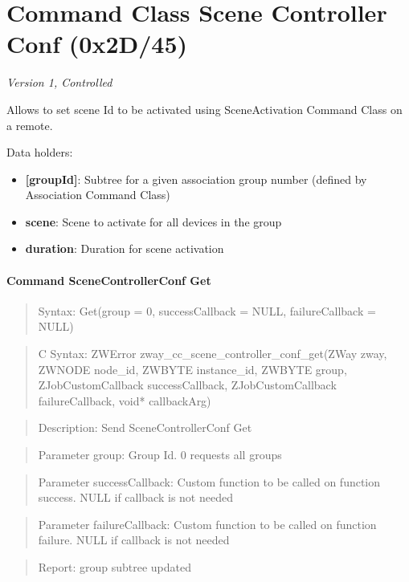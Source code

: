 \section{Command Class Scene Controller Conf (0x2D/45)}

\textit{Version 1, Controlled}
\newline

Allows to set scene Id to be activated using SceneActivation Command Class on a remote.
\newline

\noindent
Data holders:

\begin{itemize}
\item \textbf{[groupId]}: Subtree for a given association group number (defined by Association Command Class)
\item \qquad\textbf{scene}: Scene to activate for all devices in the group
\item \qquad\textbf{duration}: Duration for scene activation
\end{itemize}

\paragraph{Command SceneControllerConf Get}
\begin{quote}Syntax: Get(group = 0, successCallback = NULL, failureCallback = NULL)\end{quote}
\begin{quote}C Syntax: ZWError zway\_cc\_scene\_controller\_conf\_get(ZWay zway, ZWNODE node\_id, ZWBYTE instance\_id, ZWBYTE group, ZJobCustomCallback successCallback, ZJobCustomCallback failureCallback, void* callbackArg)\end{quote}
\begin{quote}Description: Send SceneControllerConf Get\end{quote}
\begin{quote}Parameter group: Group Id. 0 requests all groups\end{quote}
\begin{quote}Parameter successCallback: Custom function to be called on function success. NULL if callback is not needed\end{quote}
\begin{quote}Parameter failureCallback: Custom function to be called on function failure. NULL if callback is not needed\end{quote}
\begin{quote}Report: group subtree updated\end{quote}


